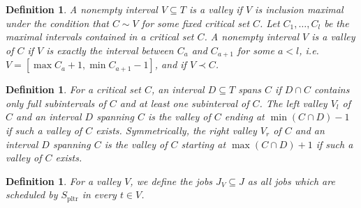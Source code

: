 \documentclass[a4paper]{article}
\DeclareMathOperator{\pltr}{pltr}
\newtheorem{definition}[theorem]{Definition}
\begin{document}
\begin{definition}
A nonempty interval $V \subseteq T$ is a \emph{valley} if $V$ is inclusion maximal under the condition that $C \sim V$ for some fixed critical set $C$.
Let $C_1, \ldots, C_l$ be the maximal intervals contained in a critical set $C$.
A nonempty interval $V$ is a \emph{valley of $C$} if $V$ is exactly the interval between $C_{a}$ and $C_{a+1}$ for some $a < l$, i.e. $V = [\max C_a + 1, \min C_{a+1} - 1]$, and if $V \prec C$.
\end{definition}
\begin{definition}
  For a critical set $C$, an interval $D \subseteq T$ \emph{spans} $C$ if $D \cap C$ contains only full subintervals of $C$ and at least one subinterval of $C$.
  The \emph{left valley} $V_l$ of $C$ and an interval $D$ spanning $C$ is the valley of $C$ ending at $\min (C \cap D) - 1$ if such a valley of $C$ exists.
  Symmetrically, the \emph{right valley} $V_r$ of $C$ and an interval $D$ spanning $C$ is the valley of $C$ starting at $\max (C \cap D) + 1$ if such a valley of $C$ exists.
\end{definition}

\begin{definition}
  For a valley $V$, we define the jobs $J_V \subseteq J$ as all jobs which are scheduled by $S_{\pltr}$ in every $t \in V$.
\end{definition}
\end{document}
